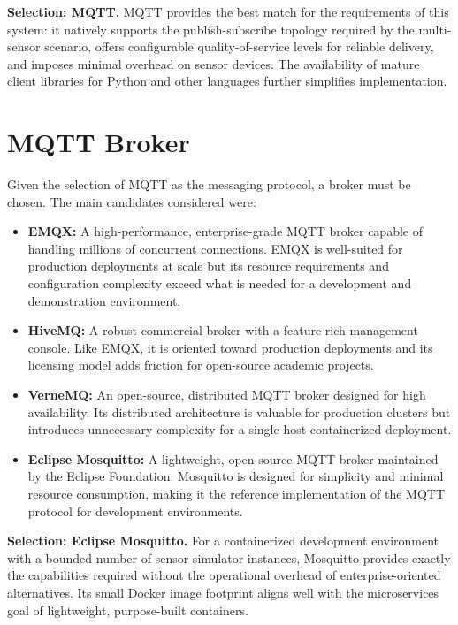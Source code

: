 \textbf{Selection: MQTT.} MQTT provides the best match for the requirements of this system: it natively supports the publish-subscribe topology required by the multi-sensor scenario, offers configurable quality-of-service levels for reliable delivery, and imposes minimal overhead on sensor devices. The availability of mature client libraries for Python and other languages further simplifies implementation.

\section{MQTT Broker}

Given the selection of MQTT as the messaging protocol, a broker must be chosen. The main candidates considered were:

\begin{itemize}
    \item \textbf{EMQX:} A high-performance, enterprise-grade MQTT broker capable of handling millions of concurrent connections. EMQX is well-suited for production deployments at scale but its resource requirements and configuration complexity exceed what is needed for a development and demonstration environment.
    \item \textbf{HiveMQ:} A robust commercial broker with a feature-rich management console. Like EMQX, it is oriented toward production deployments and its licensing model adds friction for open-source academic projects.
    \item \textbf{VerneMQ:} An open-source, distributed MQTT broker designed for high availability. Its distributed architecture is valuable for production clusters but introduces unnecessary complexity for a single-host containerized deployment.
    \item \textbf{Eclipse Mosquitto:} A lightweight, open-source MQTT broker maintained by the Eclipse Foundation. Mosquitto is designed for simplicity and minimal resource consumption, making it the reference implementation of the MQTT protocol for development environments.
\end{itemize}

\textbf{Selection: Eclipse Mosquitto.} For a containerized development environment with a bounded number of sensor simulator instances, Mosquitto provides exactly the capabilities required without the operational overhead of enterprise-oriented alternatives. Its small Docker image footprint aligns well with the microservices goal of lightweight, purpose-built containers.

